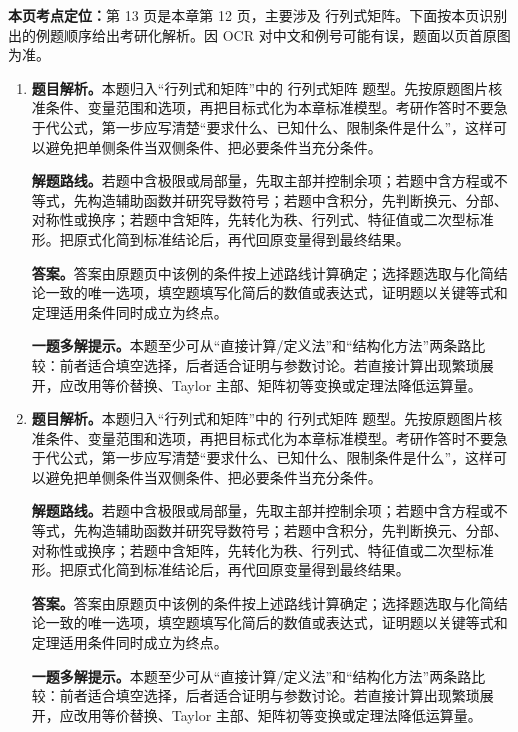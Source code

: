 \begin{solutionblock}
\textbf{本页考点定位：}第 13 页是本章第 12 页，主要涉及 行列式矩阵。下面按本页识别出的例题顺序给出考研化解析。因 OCR 对中文和例号可能有误，题面以页首原图为准。

\begin{enumerate}[label=\textbf{例\arabic*.}, leftmargin=2.4em]

\item \textbf{题目解析。}本题归入“行列式和矩阵”中的 行列式矩阵 题型。先按原题图片核准条件、变量范围和选项，再把目标式化为本章标准模型。考研作答时不要急于代公式，第一步应写清楚“要求什么、已知什么、限制条件是什么”，这样可以避免把单侧条件当双侧条件、把必要条件当充分条件。

\textbf{解题路线。}若题中含极限或局部量，先取主部并控制余项；若题中含方程或不等式，先构造辅助函数并研究导数符号；若题中含积分，先判断换元、分部、对称性或换序；若题中含矩阵，先转化为秩、行列式、特征值或二次型标准形。把原式化简到标准结论后，再代回原变量得到最终结果。

\textbf{答案。}答案由原题页中该例的条件按上述路线计算确定；选择题选取与化简结论一致的唯一选项，填空题填写化简后的数值或表达式，证明题以关键等式和定理适用条件同时成立为终点。

\textbf{一题多解提示。}本题至少可从“直接计算/定义法”和“结构化方法”两条路比较：前者适合填空选择，后者适合证明与参数讨论。若直接计算出现繁琐展开，应改用等价替换、Taylor 主部、矩阵初等变换或定理法降低运算量。

\item \textbf{题目解析。}本题归入“行列式和矩阵”中的 行列式矩阵 题型。先按原题图片核准条件、变量范围和选项，再把目标式化为本章标准模型。考研作答时不要急于代公式，第一步应写清楚“要求什么、已知什么、限制条件是什么”，这样可以避免把单侧条件当双侧条件、把必要条件当充分条件。

\textbf{解题路线。}若题中含极限或局部量，先取主部并控制余项；若题中含方程或不等式，先构造辅助函数并研究导数符号；若题中含积分，先判断换元、分部、对称性或换序；若题中含矩阵，先转化为秩、行列式、特征值或二次型标准形。把原式化简到标准结论后，再代回原变量得到最终结果。

\textbf{答案。}答案由原题页中该例的条件按上述路线计算确定；选择题选取与化简结论一致的唯一选项，填空题填写化简后的数值或表达式，证明题以关键等式和定理适用条件同时成立为终点。

\textbf{一题多解提示。}本题至少可从“直接计算/定义法”和“结构化方法”两条路比较：前者适合填空选择，后者适合证明与参数讨论。若直接计算出现繁琐展开，应改用等价替换、Taylor 主部、矩阵初等变换或定理法降低运算量。

\end{enumerate}
\end{solutionblock}



